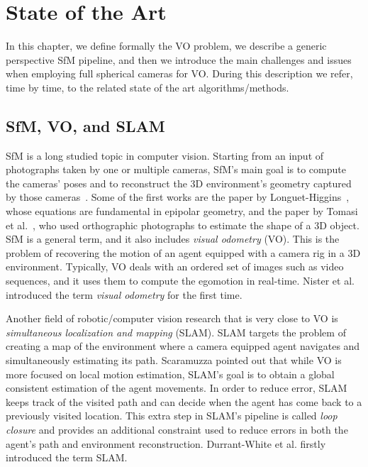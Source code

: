 \chapter{State of the Art}
\label{ch:state_of_the_art}
%
In this chapter, we define formally the VO problem, we describe a generic perspective SfM pipeline, 
and then we introduce the main challenges and issues when employing full spherical cameras for VO.
During this description we refer, time by time, to the related state of the art algorithms/methods.

%

\section{SfM, VO, and SLAM}
SfM is a long studied topic in computer vision. Starting from an input of photographs taken by one or multiple cameras, SfM's main goal is to compute the cameras' poses and to reconstruct the 3D environment's geometry captured by those cameras~\cite{szeliski2010computer}.
%
Some of the first works are the paper by Longuet-Higgins~\cite{longuet1981computer}, whose equations are fundamental in epipolar geometry, and the paper by Tomasi et al.~\cite{tomasi1992shape}, who used orthographic photographs to estimate the shape of a 3D object.
%
SfM is a general term, and it also includes \textit{visual odometry} (VO). This is the problem of recovering the motion of an agent equipped with a camera rig in a 3D environment. Typically, VO deals with an ordered set of images such as video sequences, and it uses them to compute the egomotion in real-time. Nister et al.\cite{nister2004visual} introduced the term \textit{visual odometry} for the first time.

Another field of robotic/computer vision research that is very close to VO is \textit{simultaneous localization and mapping} (SLAM). SLAM targets the problem of creating a map of the environment where a camera equipped agent navigates and simultaneously estimating its path. Scaramuzza\cite{scaramuzzaVisualOdometryI} pointed out that while VO is more focused on local motion estimation, SLAM's goal is to obtain a global consistent estimation of the agent movements.
%
In order to reduce error, SLAM keeps track of the visited path and can decide when the agent has come back to a previously visited location. This extra step in SLAM's pipeline is called \textit{loop closure} and provides an additional constraint used to reduce errors in both the agent's path and 
environment reconstruction. Durrant-White et al.\cite{durrant1996localization} firstly introduced the term SLAM.
 
